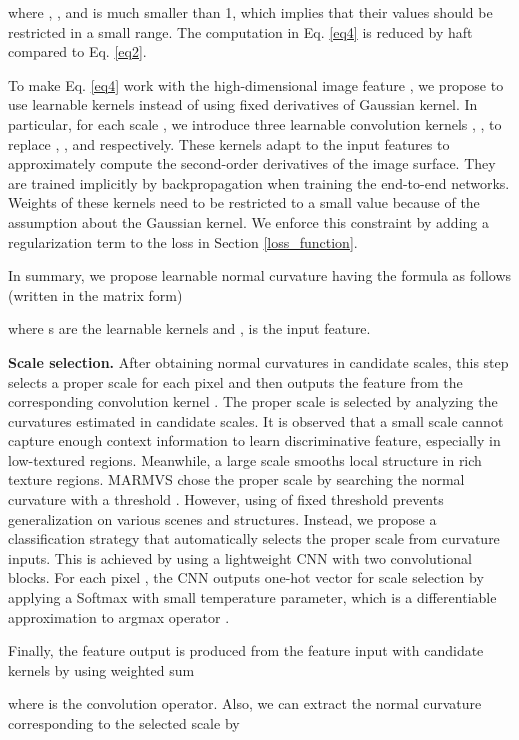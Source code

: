 \documentclass{article} \usepackage{iclr2022_conference,times}
\begin{document}
where , ,  and   is much smaller than 1, which implies that their values should be restricted in a small range. The computation in Eq. \ref{eq4} is reduced by haft compared to Eq. \ref{eq2}.

To make Eq. \ref{eq4} work with the high-dimensional image feature , we propose to use learnable kernels instead of using fixed derivatives of Gaussian kernel. In particular, for each scale , we introduce three learnable convolution kernels , ,  to replace , , and  respectively. These kernels adapt to the input features to approximately compute the second-order derivatives of the image surface. They are trained implicitly by backpropagation when training the end-to-end networks. Weights of these kernels need to be restricted to a small value  because of the assumption about the Gaussian kernel. We enforce this constraint by adding a regularization term to the loss in Section \ref{loss_function}.

In summary, we propose learnable normal curvature having the formula as follows (written in the matrix form)

where s are the learnable kernels and ,  is the input feature.

\textbf{Scale selection.} After obtaining  normal curvatures  in  candidate scales, this step selects a proper scale  for each pixel  and then outputs the feature  from the corresponding convolution kernel . The proper scale is selected by analyzing the curvatures estimated in  candidate scales. It is observed that a small scale cannot capture enough context information to learn discriminative feature, especially in low-textured regions. Meanwhile, a large scale smooths local structure in rich texture regions. MARMVS \citep{xu2020marmvs} chose the proper scale by searching the normal curvature with a threshold . However, using of fixed threshold  prevents generalization on various scenes and structures. 
Instead, we propose a classification strategy that automatically selects the proper scale from  curvature inputs. This is achieved by using a lightweight CNN with two convolutional blocks. For each pixel , the CNN outputs one-hot vector  for scale selection by applying a Softmax with small temperature parameter, which is a differentiable approximation to argmax operator \citep{DBLP:conf/iclr/JangGP17}.



Finally, the feature output  is produced from the feature input  with  candidate kernels  by using weighted sum

where  is the convolution operator. Also, we can extract the normal curvature corresponding to the selected scale by
\end{document}
